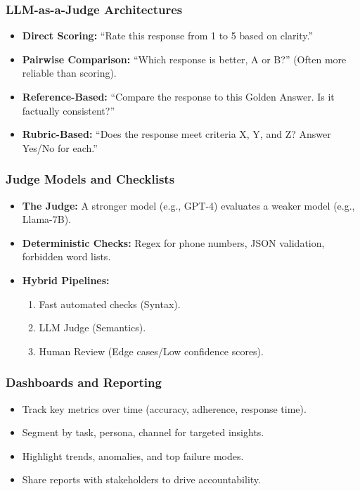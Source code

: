 \documentclass{beamer}
\begin{document}
\begin{frame}
    \frametitle{LLM-as-a-Judge Architectures}
    \begin{itemize}
        \item \textbf{Direct Scoring:} ``Rate this response from 1 to 5 based on clarity.''
        \item \textbf{Pairwise Comparison:} ``Which response is better, A or B?'' (Often more reliable than scoring).
        \item \textbf{Reference-Based:} ``Compare the response to this Golden Answer. Is it factually consistent?''
        \item \textbf{Rubric-Based:} ``Does the response meet criteria X, Y, and Z? Answer Yes/No for each.''
    \end{itemize}
\end{frame}

\begin{frame}
    \frametitle{Judge Models and Checklists}
    \begin{itemize}
        \item \textbf{The Judge:} A stronger model (e.g., GPT-4) evaluates a weaker model (e.g., Llama-7B).
        \item \textbf{Deterministic Checks:} Regex for phone numbers, JSON validation, forbidden word lists.
        \item \textbf{Hybrid Pipelines:}
        \begin{enumerate}
            \item Fast automated checks (Syntax).
            \item LLM Judge (Semantics).
            \item Human Review (Edge cases/Low confidence scores).
        \end{enumerate}
    \end{itemize}
\end{frame}

\begin{frame}
    \frametitle{Dashboards and Reporting}
    \begin{itemize}
        \item Track key metrics over time (accuracy, adherence, response time).
        \item Segment by task, persona, channel for targeted insights.
        \item Highlight trends, anomalies, and top failure modes.
        \item Share reports with stakeholders to drive accountability.
    \end{itemize}
\end{frame}
\end{document}
